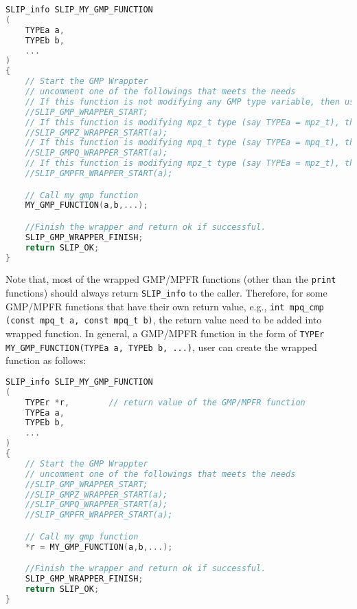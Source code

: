 \documentclass[12pt]{article}
\theoremstyle{definition}
\begin{document}
\begin{lstlisting}[language=C,frame=single]
SLIP_info SLIP_MY_GMP_FUNCTION
(
    TYPEa a,
    TYPEb b,
    ...
)
{
    // Start the GMP Wrappter
    // uncomment one of the followings that meets the needs
    // If this function is not modifying any GMP type variable, then use
    //SLIP_GMP_WRAPPER_START;
    // If this function is modifying mpz_t type (say TYPEa = mpz_t), then use
    //SLIP_GMPZ_WRAPPER_START(a);
    // If this function is modifying mpq_t type (say TYPEa = mpq_t), then use
    //SLIP_GMPQ_WRAPPER_START(a);
    // If this function is modifying mpz_t type (say TYPEa = mpz_t), then use
    //SLIP_GMPFR_WRAPPER_START(a);

    // Call my gmp function
    MY_GMP_FUNCTION(a,b,...);

    //Finish the wrapper and return ok if successful.
    SLIP_GMP_WRAPPER_FINISH;
    return SLIP_OK;
}
\end{lstlisting}

Note that, most of the wrapped GMP/MPFR functions (other than the \verb|print| functions) should always return \verb|SLIP_info| to the caller. Therefore, for some GMP/MPFR functions that have their own return value, e.g., \verb|int mpq_cmp (const mpq_t a, const mpq_t b)|, the return value need to be added into wrapped function. In general, a GMP/MPFR function in the form of \verb|TYPEr MY_GMP_FUNCTION(TYPEa a, TYPEb b, ...)|, user can create the wrapped function as follows:

\newpage

\begin{lstlisting}[language=C,frame=single]
SLIP_info SLIP_MY_GMP_FUNCTION
(
    TYPEr *r,        // return value of the GMP/MPFR function
    TYPEa a,
    TYPEb b,
    ...
)
{
    // Start the GMP Wrappter
    // uncomment one of the followings that meets the needs
    //SLIP_GMP_WRAPPER_START;
    //SLIP_GMPZ_WRAPPER_START(a);
    //SLIP_GMPQ_WRAPPER_START(a);
    //SLIP_GMPFR_WRAPPER_START(a);

    // Call my gmp function
    *r = MY_GMP_FUNCTION(a,b,...);

    //Finish the wrapper and return ok if successful.
    SLIP_GMP_WRAPPER_FINISH;
    return SLIP_OK;
}
\end{lstlisting}
\end{document}
